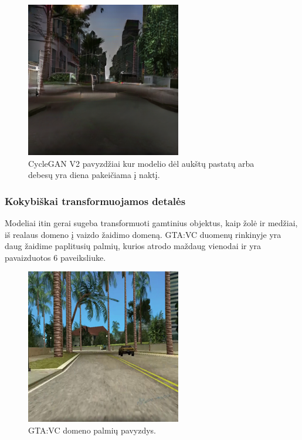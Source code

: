 \documentclass{VUMIFPSbakalaurinis}
\begin{document}
\begin{figure}[H]
                    \includegraphics[scale=0.7]{img/debesu_fake}
                    \caption{CycleGAN V2 pavyzdžiai kur modelio dėl aukštų pastatų arba debesų yra diena  pakeičiama į naktį.}
                    \label{img:mlp}
                \end{figure}
        \subsubsection{Kokybiškai transformuojamos detalės}
            Modeliai itin gerai sugeba transformuoti gamtinius objektus, kaip žolė ir medžiai, iš realaus domeno į vaizdo žaidimo domeną. GTA:VC duomenų rinkinyje yra daug žaidime paplitusių palmių, kurios atrodo maždaug vienodai ir yra pavaizduotos 6 paveiksliuke.
            \begin{figure}[H]
                \centering
                \includegraphics[scale=0.7]{img/palmiu_pvz}
                \caption{GTA:VC domeno palmių pavyzdys.}
                \label{img:mlp}
            \end{figure}
    
\end{document}
